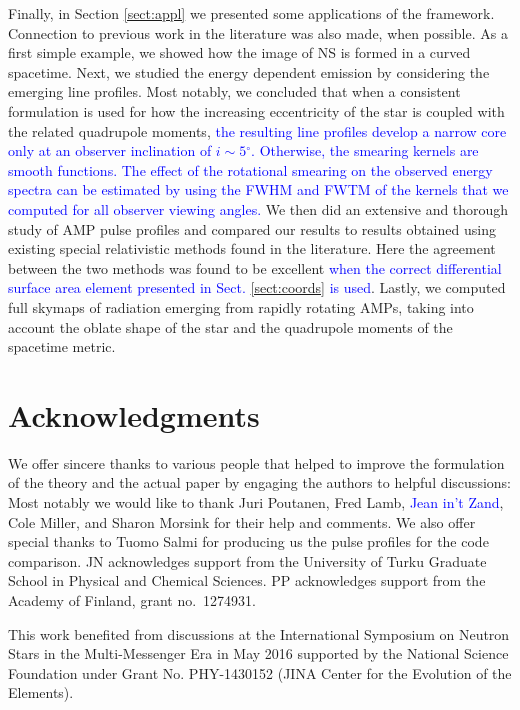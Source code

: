 \documentclass{aa}
\newcommand{\red}[1]{\textcolor{red}{#1}}
\newcommand{\refe}[1]{\textcolor{blue}{{#1}}}
\renewcommand{\deg}{\ensuremath{^{\circ}}}
\begin{document}
Finally, in Section \ref{sect:appl} we presented some applications of the framework.
Connection to previous work in the literature was also made, when possible.
As a first simple example, we showed how the image of NS is formed in a curved spacetime.
Next, we studied the energy dependent emission by considering the emerging line profiles.
Most notably, we concluded that when a consistent formulation is used for how the increasing eccentricity of the star is coupled with the related quadrupole moments, \refe{the resulting line profiles develop a narrow core only at an observer inclination of $i \sim 5\deg$.}
\refe{Otherwise, the smearing kernels are smooth functions.}
\refe{The effect of the rotational smearing on the observed energy spectra can be estimated by using the FWHM and FWTM of the kernels that we computed for all observer viewing angles.}
We then did an extensive and thorough study of AMP pulse profiles and compared our results to results obtained using existing special relativistic methods found in the literature.
Here the agreement between the two methods was found to be excellent \refe{when the correct differential surface area element presented in Sect. \ref{sect:coords} is used}.
Lastly, we computed full skymaps of radiation emerging from rapidly rotating AMPs, taking into account the oblate shape of the star and the quadrupole moments of the spacetime metric.



\section*{Acknowledgments}

\small{
We offer sincere thanks to various people that helped to improve the formulation of the theory and the actual paper by engaging the authors to helpful discussions: 
Most notably we would like to thank Juri Poutanen, Fred Lamb, \refe{Jean in't Zand}, Cole Miller, and Sharon Morsink for their help and comments.
We also offer special thanks to Tuomo Salmi for producing us the pulse profiles for the code comparison.
JN acknowledges support from the University of Turku Graduate School in Physical and Chemical Sciences.
PP acknowledges support from the Academy of Finland, grant no.~1274931.

This work benefited from discussions at the International Symposium on Neutron Stars in the Multi-Messenger Era in May 2016 supported by the National Science Foundation under Grant No. PHY-1430152 (JINA Center for the Evolution of the Elements).
}
\end{document}
